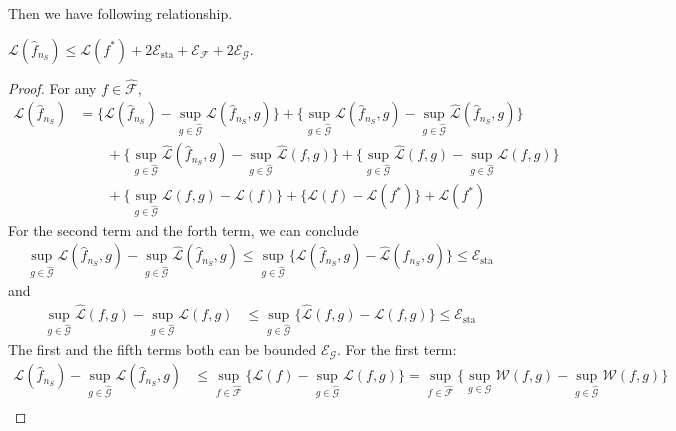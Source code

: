 Then we have following relationship.
\begin{lemma}
$\mathcal{L}(\hat{f}_{n_S}) \leq \mathcal{L}(f^*) +  2\mathcal{E}_{\mathrm{sta}} + \mathcal{E}_{\mathcal{F}} + 2\mathcal{E}_{\mathcal{G}}$.
\end{lemma}
\begin{proof}
    For any $f \in \widehat{\mathcal{F}}$,
    \begin{align*}
        \mathcal{L}(\hat{f}_{n_S}) &= \big\{\mathcal{L}(\hat{f}_{n_S}) - \sup_{g \in \widehat{\mathcal{G}}}\mathcal{L}(\hat{f}_{n_S}, g)\big\} + \big\{\sup_{g \in \widehat{\mathcal{G}}}\mathcal{L}(\hat{f}_{n_S}, g) - \sup_{g \in \widehat{\mathcal{G}}}\widehat{\mathcal{L}}(\hat{f}_{n_S}, g)\big\} \\
        &\qquad +\big\{\sup_{g \in \widehat{\mathcal{G}}}\widehat{\mathcal{L}}(\hat{f}_{n_S}, g) - \sup_{g \in \widehat{\mathcal{G}}}\widehat{\mathcal{L}}(f, g)\big\} + \big\{\sup_{g \in \widehat{\mathcal{G}}}\widehat{\mathcal{L}}(f, g) - \sup_{g \in \widehat{\mathcal{G}}}\mathcal{L}(f, g)\big\} \\
        &\qquad +\big\{\sup_{g \in \widehat{\mathcal{G}}}\mathcal{L}(f, g) - \mathcal{L}(f)\big\} + \big\{\mathcal{L}(f) - \mathcal{L}(f^*)\big\} + \mathcal{L}(f^*)
    \end{align*}
    For the second term and the forth term, we can conclude
    \begin{align*}
        \sup_{g \in \widehat{\mathcal{G}}}\mathcal{L}(\hat{f}_{n_S}, g) - \sup_{g \in \widehat{\mathcal{G}}}\widehat{\mathcal{L}}(\hat{f}_{n_S}, g) \leq \sup_{g \in \widehat{\mathcal{G}}}\{\mathcal{L}(\hat{f}_{n_S}, g) - \widehat{\mathcal{L}}(\hat{f}_{n_S}, g)\} \leq  \mathcal{E}_{\mathrm{sta}}
    \end{align*}
    and
    \begin{align*}
        \sup_{g \in \widehat{\mathcal{G}}}\widehat{\mathcal{L}}(f, g) - \sup_{g \in \widehat{\mathcal{G}}}\mathcal{L}(f, g) &\leq \sup_{g \in \widehat{\mathcal{G}}}\{\widehat{\mathcal{L}}(f, g) - \mathcal{L}(f, g)\}\leq \mathcal{E}_{\mathrm{sta}}
    \end{align*}
    The first and the fifth terms both can be bounded $\mathcal{E}_{\mathcal{G}}$. For the first term:
    \begin{align*}
        \mathcal{L}(\hat{f}_{n_S}) - \sup_{g \in \widehat{\mathcal{G}}}\mathcal{L}(\hat{f}_{n_S}, g) &\leq \sup_{f \in \widehat{\mathcal{F}}}\{\mathcal{L}(f) - \sup_{g \in \widehat{\mathcal{G}}}\mathcal{L}(f, g)\} = \sup_{f \in \widehat{\mathcal{F}}}\{\sup_{g \in \mathcal{G}}\mathcal{W}(f, g) - \sup_{g \in \widehat{\mathcal{G}}}\mathcal{W}(f, g)\} \\

\end{align*}
\end{proof}
